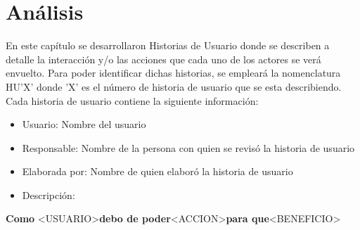 \chapter{Análisis} \label{chap: historias de usuario}
En este capítulo se desarrollaron Historias de Usuario donde se describen a detalle la interacción y/o las acciones que cada uno de los actores se verá envuelto. Para poder identificar dichas historias, se empleará la nomenclatura HU'X' donde 'X' es el número de historia de usuario que se esta describiendo.
\\
Cada historia de usuario contiene la siguiente información:

\begin{itemize}
	\item Usuario: Nombre del usuario
	\item Responsable: Nombre de la persona con quien se revisó la historia de usuario
	\item Elaborada por: Nombre de quien elaboró la historia de usuario
	\item Descripción:
\end{itemize}

	\textbf{Como} \textless USUARIO\textgreater \textbf{debo de poder}\textless ACCION\textgreater \textbf{para que}\textless BENEFICIO\textgreater

\clearpage

\clearpage

\vspace{3cm}

\clearpage

\vspace{3cm}

\clearpage

\vspace{3cm}

\clearpage

\vspace{3cm}

\clearpage

\vspace{3cm}

\clearpage

\vspace{3cm}

\clearpage

\vspace{3cm}

\clearpage

\vspace{3cm}

\clearpage

\vspace{3cm}

\clearpage

\vspace{3cm}
